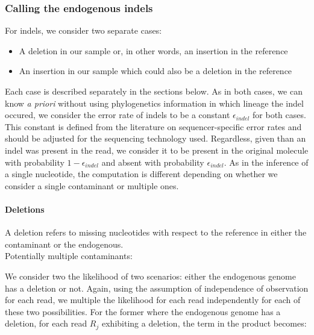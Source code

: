 \documentclass[a4paper,12pt]{article}
\begin{document}
\subsubsection{Calling the endogenous indels}

For indels, we consider two separate cases:

\begin{itemize}
\item A deletion in our sample or, in other words, an insertion in the reference 
\item An insertion in our sample which could also be a deletion in the reference
\end{itemize}

\noindent Each case is described separately in the sections below. As in both cases, we can know {\it a priori} without using phylogenetics information in which lineage the indel occured, we consider the error rate of indels to be a constant $\epsilon_{indel}$ for both cases. This constant is defined from the literature on sequencer-specific error rates\cite{minoche2011evaluation} and should be adjusted for the sequencing technology used. Regardless, given than an indel was present in the read, we consider it to be present in the original molecule with probability $1-\epsilon_{indel}$ and absent with probability $\epsilon_{indel}$. As in the inference of a single nucleotide, the computation is different depending on whether we consider a single contaminant or multiple ones.

\noindent \paragraph{Deletions}

A deletion refers to missing nucleotides with respect to the reference in either the contaminant or the endogenous. \\


\noindent  Potentially multiple contaminants:

We consider two the likelihood of two scenarios: either the endogenous genome has a deletion or not. Again, using the assumption of independence of observation for each read, we multiple the likelihood for each read independently for each of these two possibilities. For the former where the endogenous genome has a deletion, for each read $R_j$ exhibiting a deletion, the term in the product becomes:
\end{document}
